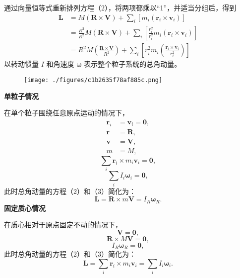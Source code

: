 通过向量恒等式重新排列方程（2），将两项都乘以“1”，并适当分组后，得到
\begin{equation}
\begin{aligned}
    \mathbf{L} &= M (\mathbf{R} \times \mathbf{V}) + \sum_{i} \left[ m_{i} (\mathbf{r}_{i} \times \mathbf{v}_{i}) \right] \\
    & = \frac{R^{2}}{R^{2}} M \left( \mathbf{R} \times \mathbf{V} \right) + \sum_{i} \left[ \frac{r_{i}^{2}}{r_{i}^{2}} m_{i} \left( \mathbf{r}_{i} \times \mathbf{v}_{i} \right) \right] \\
    &=R^{2} M \left( \frac{\mathbf{R} \times \mathbf{V}}{R^{2}} \right) + \sum_{i} \left[ r_{i}^{2} m_{i} \left( \frac{\mathbf{r}_{i} \times \mathbf{v}_{i}}{r_{i}^{2}} \right) \right]
\end{aligned}~
\end{equation} 
以转动惯量 \( I \) 和角速度 \( \boldsymbol{\omega} \) 表示整个粒子系统的总角动量。
\begin{figure}[ht]
\centering
\texttt{[image: ./figures/c1b2635f78af885c.png]}
\caption{} \label{fig_JDL_9}
\end{figure}
\textbf{单粒子情况}

在单个粒子围绕任意原点运动的情况下，
\[
\begin{aligned}
\mathbf{r}_{i} &= \mathbf{v}_{i} = \mathbf{0}, \\
\mathbf{r} &= \mathbf{R}, \\
\mathbf{v} &= \mathbf{V}, \\
m &= M,
\end{aligned}~
\]
\[
\sum_{i} \mathbf{r}_{i} \times m_{i} \mathbf{v}_{i} = \mathbf{0},~
\]
\[
\sum_{i} I_{i} \boldsymbol{\omega}_{i} = \mathbf{0},~
\]
此时总角动量的方程（2）和（3）简化为：
\[
\mathbf{L} = \mathbf{R} \times m \mathbf{V} = I_{R} \boldsymbol{\omega}_{R}.~
\] 
\textbf{固定质心情况}

在质心相对于原点固定不动的情况下，
\[
\mathbf{V} = \mathbf{0},~
\]
\[
\mathbf{R} \times M \mathbf{V} = \mathbf{0},~
\]
\[
I_{R} \boldsymbol{\omega}_{R} = \mathbf{0},~
\]
此时总角动量的方程（2）和（3）简化为：
\[
\mathbf{L} = \sum_{i} \mathbf{r}_{i} \times m_{i} \mathbf{v}_{i} = \sum_{i} I_{i} \boldsymbol{\omega}_{i}.~ 
\] 
